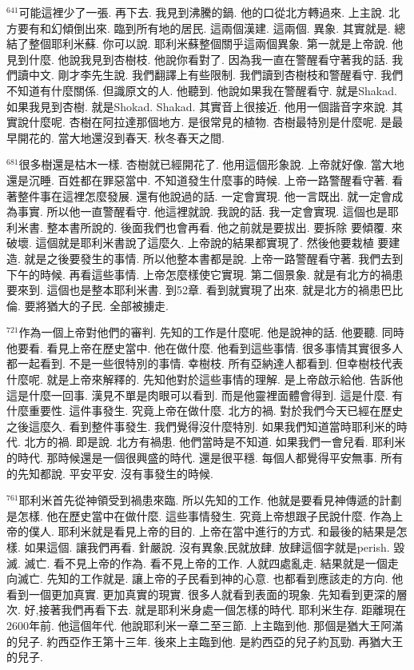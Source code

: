 \documentclass{book}
\begin{document}
$^{641}$可能這裡少了一張.
再下去.
我見到沸騰的鍋.
他的口從北方轉過來.
上主說.
北方要有和幻傾倒出來.
臨到所有地的居民.
這兩個漢建.
這兩個.
異象.
其實就是.
總結了整個耶利米蘇.
你可以說.
耶利米蘇整個關乎這兩個異象.
第一就是上帝說.
他見到什麼.
他說我見到杏樹枝.
他說你看對了.
因為我一直在警醒看守著我的話.
我們讀中文.
剛才李先生說.
我們翻譯上有些限制.
我們讀到杏樹枝和警醒看守.
我們不知道有什麼關係.
但識原文的人.
他聽到.
他說如果我在警醒看守.
就是Shakad.
如果我見到杏樹.
就是Shokad.
Shakad.
其實音上很接近.
他用一個諧音字來說.
其實說什麼呢.
杏樹在阿拉達那個地方.
是很常見的植物.
杏樹最特別是什麼呢.
是最早開花的.
當大地還沒到春天.
秋冬春天之間.

$^{681}$很多樹還是枯木一樣.
杏樹就已經開花了.
他用這個形象說.
上帝就好像.
當大地還是沉睡.
百姓都在罪惡當中.
不知道發生什麼事的時候.
上帝一路警醒看守著.
看著整件事在這裡怎麼發展.
還有他說過的話.
一定會實現.
他一言既出.
就一定會成為事實.
所以他一直警醒看守.
他這裡就說.
我說的話.
我一定會實現.
這個也是耶利米書.
整本書所說的.
後面我們也會再看.
他之前就是要拔出.
要拆除 要傾覆.
來破壞.
這個就是耶利米書說了這麼久.
上帝說的結果都實現了.
然後他要栽植 要建造.
就是之後要發生的事情.
所以他整本書都是說.
上帝一路警醒看守著.
我們去到下午的時候.
再看這些事情.
上帝怎麼樣使它實現.
第二個景象.
就是有北方的禍患要來到.
這個也是整本耶利米書.
到52章.
看到就實現了出來.
就是北方的禍患巴比倫.
要將猶大的子民.
全部被擄走.

$^{721}$作為一個上帝對他們的審判.
先知的工作是什麼呢.
他是說神的話.
他要聽.
同時他要看.
看見上帝在歷史當中.
他在做什麼.
他看到這些事情.
很多事情其實很多人都一起看到.
不是一些很特別的事情.
幸樹枝.
所有亞納達人都看到.
但幸樹枝代表什麼呢.
就是上帝來解釋的.
先知他對於這些事情的理解.
是上帝啟示給他.
告訴他這是什麼一回事.
漢見不單是肉眼可以看到.
而是他靈裡面體會得到.
這是什麼.
有什麼重要性.
這件事發生.
究竟上帝在做什麼.
北方的禍.
對於我們今天已經在歷史之後這麼久.
看到整件事發生.
我們覺得沒什麼特別.
如果我們知道當時耶利米的時代.
北方的禍.
即是說.
北方有禍患.
他們當時是不知道.
如果我們一會兒看.
耶利米的時代.
那時候還是一個很興盛的時代.
還是很平穩.
每個人都覺得平安無事.
所有的先知都說.
平安平安.
沒有事發生的時候.

$^{761}$耶利米首先從神領受到禍患來臨.
所以先知的工作.
他就是要看見神傳遞的計劃是怎樣.
他在歷史當中在做什麼.
這些事情發生.
究竟上帝想跟子民說什麼.
作為上帝的僕人.
耶利米就是看見上帝的目的.
上帝在當中進行的方式.
和最後的結果是怎樣.
如果這個.
讓我們再看.
針嚴說.
沒有異象,民就放肆.
放肆這個字就是perish.
毀滅.
滅亡.
看不見上帝的作為.
看不見上帝的工作.
人就四處亂走.
結果就是一個走向滅亡.
先知的工作就是.
讓上帝的子民看到神的心意.
也都看到應該走的方向.
他看到一個更加真實.
更加真實的現實.
很多人就看到表面的現象.
先知看到更深的層次.
好,接著我們再看下去.
就是耶利米身處一個怎樣的時代.
耶利米生存.
距離現在2600年前.
他這個年代.
他說耶利米一章二至三節.
上主臨到他.
那個是猶大王阿滿的兒子.
約西亞作王第十三年.
後來上主臨到他.
是約西亞的兒子約瓦勁.
再猶大王的兒子.
\end{document}
